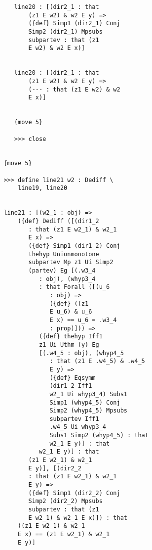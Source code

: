 \documentclass[12pt]{article}
\begin{document}
\begin{verbatim}
                  line20 : [(dir2_1 : that 
                      (z1 E w2) & w2 E y) => 
                      ({def} Simp1 (dir2_1) Conj 
                      Simp2 (dir2_1) Mpsubs 
                      subpartev : that (z1 
                      E w2) & w2 E x)]


                  line20 : [(dir2_1 : that 
                      (z1 E w2) & w2 E y) => 
                      (--- : that (z1 E w2) & w2 
                      E x)]


                  {move 5}

                  >>> close


               {move 5}

               >>> define line21 w2 : Dediff \
                   line19, line20


               line21 : [(w2_1 : obj) => 
                   ({def} Dediff ([(dir1_2 
                      : that (z1 E w2_1) & w2_1 
                      E x) => 
                      ({def} Simp1 (dir1_2) Conj 
                      thehyp Unionmonotone 
                      subpartev Mp z1 Ui Simp2 
                      (partev) Eg [(.w3_4 
                         : obj), (whyp3_4 
                         : that Forall ([(u_6 
                            : obj) => 
                            ({def} ((z1 
                            E u_6) & u_6 
                            E x) == u_6 = .w3_4 
                            : prop)])) => 
                         ({def} thehyp Iff1 
                         z1 Ui Uthm (y) Eg 
                         [(.w4_5 : obj), (whyp4_5 
                            : that (z1 E .w4_5) & .w4_5 
                            E y) => 
                            ({def} Eqsymm 
                            (dir1_2 Iff1 
                            w2_1 Ui whyp3_4) Subs1 
                            Simp1 (whyp4_5) Conj 
                            Simp2 (whyp4_5) Mpsubs 
                            subpartev Iff1 
                            .w4_5 Ui whyp3_4 
                            Subs1 Simp2 (whyp4_5) : that 
                            w2_1 E y)] : that 
                         w2_1 E y)] : that 
                      (z1 E w2_1) & w2_1 
                      E y)], [(dir2_2 
                      : that (z1 E w2_1) & w2_1 
                      E y) => 
                      ({def} Simp1 (dir2_2) Conj 
                      Simp2 (dir2_2) Mpsubs 
                      subpartev : that (z1 
                      E w2_1) & w2_1 E x)]) : that 
                   ((z1 E w2_1) & w2_1 
                   E x) == (z1 E w2_1) & w2_1 
                   E y)]



\end{verbatim}
\end{document}
